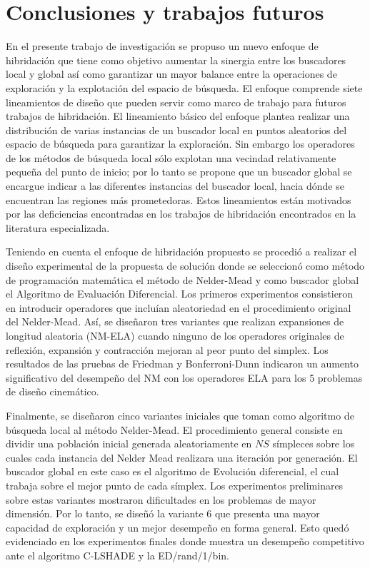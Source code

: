 \chapter{Conclusiones y trabajos futuros} \label{Chapter8}
En el presente trabajo de investigación se propuso un nuevo enfoque de hibridación que tiene como objetivo aumentar la sinergia entre los buscadores local y global así como garantizar un mayor balance entre la operaciones de exploración y la explotación del espacio de búsqueda. El enfoque comprende siete lineamientos de diseño que pueden servir como marco de trabajo para futuros trabajos de hibridación. El lineamiento básico del enfoque plantea realizar una distribución de varias instancias de un buscador local en puntos aleatorios del espacio de búsqueda para garantizar la exploración. Sin embargo los operadores de los métodos de búsqueda local sólo explotan una vecindad relativamente pequeña del punto de inicio; por lo tanto se propone que un buscador global se encargue indicar a las diferentes instancias del buscador local, hacia dónde se encuentran las regiones más prometedoras. Estos lineamientos están motivados por las deficiencias encontradas en los trabajos de hibridación encontrados en la literatura especializada.

Teniendo en cuenta el enfoque de hibridación propuesto se procedió a realizar el diseño experimental de la propuesta de solución donde se seleccionó como método de programación matemática el método de Nelder-Mead y como buscador global el Algoritmo de Evaluación Diferencial. Los primeros experimentos consistieron en introducir operadores que incluían aleatoriedad en el procedimiento original del Nelder-Mead. Así, se diseñaron tres variantes que realizan expansiones de longitud aleatoria (NM-ELA) cuando ninguno de los operadores originales de reflexión, expansión y contracción mejoran al peor punto del simplex. Los resultados de las pruebas de Friedman y Bonferroni-Dunn indicaron un aumento significativo del desempeño del NM con los operadores ELA para los 5 problemas de diseño cinemático. 

Finalmente, se diseñaron cinco variantes iniciales que toman como algoritmo de búsqueda local al método Nelder-Mead. El procedimiento general consiste en dividir una población inicial generada aleatoriamente en $NS$ símpleces sobre los cuales cada instancia del Nelder Mead realizara una iteración por generación. El buscador global en este caso es el algoritmo de Evolución diferencial, el cual trabaja sobre el mejor punto de cada símplex. Los experimentos preliminares sobre estas variantes mostraron dificultades en los problemas de mayor dimensión. Por lo tanto, se diseñó la variante 6 que presenta una mayor capacidad de exploración y un mejor desempeño en forma general. Esto quedó evidenciado en los experimentos finales donde muestra un desempeño competitivo ante el algoritmo C-LSHADE y la ED/rand/1/bin.

